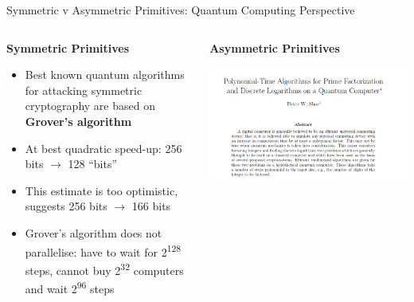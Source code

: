 \documentclass[xcolor=table,10pt,aspectratio=169]{beamer}
\begin{document}
\begin{frame}[label={sec:org48c9c3e}]{Symmetric v Asymmetric Primitives: Quantum Computing Perspective}
\begin{columns}[t]
\begin{column}{0.5\columnwidth}
\textbf{Symmetric Primitives}

\phantom{M}

\begin{itemize}
\item Best known quantum algorithms for attacking symmetric cryptography are based on \textbf{Grover’s algorithm}
\item At best quadratic speed-up: 256 bits \(\rightarrow\) 128 “bits”
\item This estimate is too optimistic,  \cite{SAC:AMGMPS16} suggests 256 bits \(\rightarrow\) 166 bits
\item Grover’s algorithm does not parallelise: have to wait for 2\textsuperscript{128} steps, cannot buy 2\textsuperscript{32} computers and wait 2\textsuperscript{96} steps
\end{itemize}
\end{column}


\begin{column}{0.5\columnwidth}
\textbf{Asymmetric Primitives}

\phantom{M}

\begin{center}
\includegraphics[width=.9\linewidth]{./shor.png}
\end{center}
\end{column}
\end{columns}
\end{frame}
\end{document}
